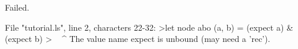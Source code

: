 \runverbatimfalse
{}
\begin{RunVerbatimMsg}
Failed.
\end{RunVerbatimMsg}
\begin{RunVerbatimErr}
File "tutorial.ls", line 2, characters 22-32:
>let node abo (a, b) = (expect a) & (expect b)
>                      ^^^^^^^^^^
The value name expect is unbound (may need a 'rec').
\end{RunVerbatimErr}
